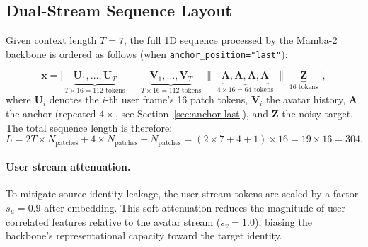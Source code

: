 \documentclass[12pt,letterpaper]{report}
\begin{document}
\subsection{Dual-Stream Sequence Layout}

Given context length $T=7$, the full 1D sequence processed by the Mamba-2
backbone is ordered as follows (when \texttt{anchor\_position="last"}): %

\begin{equation}\label{eq:seq-layout}
    \mathbf{x} = \bigl[\,
        \underbrace{\mathbf{U}_1, \ldots, \mathbf{U}_T}_{T \times 16 = 112\text{ tokens}}
        \;\|\;
        \underbrace{\mathbf{V}_1, \ldots, \mathbf{V}_T}_{T \times 16 = 112\text{ tokens}}
        \;\|\;
        \underbrace{\mathbf{A}, \mathbf{A}, \mathbf{A}, \mathbf{A}}_{4 \times 16 = 64\text{ tokens}}
        \;\|\;
        \underbrace{\mathbf{Z}}_{ 16\text{ tokens}}
    \,\bigr],
\end{equation}
%
where $\mathbf{U}_i$ denotes the $i$-th user frame's 16 patch tokens,
$\mathbf{V}_i$ the avatar history, $\mathbf{A}$ the anchor (repeated $4\times$,
see Section~\ref{sec:anchor-last}), and $\mathbf{Z}$ the noisy target. The
total sequence length is therefore:
%
\begin{equation}
    L = 2T \times N_{\mathrm{patches}} + 4 \times N_{\mathrm{patches}} + N_{\mathrm{patches}}
      = (2 \times 7 + 4 + 1) \times 16 = 19 \times 16 = 304.
\end{equation}

\paragraph{User stream attenuation.}
To mitigate source identity leakage, the user stream tokens are scaled by a
factor $s_u = 0.9$ after embedding. This soft attenuation reduces the
magnitude of user-correlated features relative to the avatar stream
($s_v = 1.0$), biasing the backbone's representational capacity toward the
target identity. %
\end{document}

